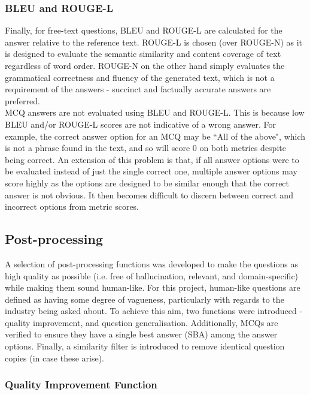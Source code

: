 \subsubsection{BLEU and ROUGE-L}

Finally, for free-text questions, BLEU and ROUGE-L are calculated for the answer relative to the reference text. ROUGE-L is chosen (over ROUGE-N) as it is designed to evaluate the semantic similarity and content coverage of text regardless of word order. ROUGE-N on the other hand simply evaluates the grammatical correctness and fluency of the generated text, which is not a requirement of the answers - succinct and factually accurate answers are preferred.\\

MCQ answers are not evaluated using BLEU and ROUGE-L. This is because low BLEU and/or ROUGE-L scores are not indicative of a wrong answer. For example, the correct answer option for an MCQ may be ``All of the above", which is not a phrase found in the text, and so will score 0 on both metrics despite being correct. An extension of this problem is that, if all answer options were to be evaluated instead of just the single correct one, multiple answer options may score highly as the options are designed to be similar enough that the correct answer is not obvious. It then becomes difficult to discern between correct and incorrect options from metric scores.

\subsection{Post-processing}

A selection of post-processing functions was developed to make the questions as high quality as possible (i.e. free of hallucination, relevant, and domain-specific) while making them sound human-like. For this project, human-like questions are defined as having some degree of vagueness, particularly with regards to the industry being asked about. To achieve this aim, two functions were introduced - quality improvement, and question generalisation. Additionally, MCQs are verified to ensure they have a single best answer (SBA) among the answer options. Finally, a similarity filter is introduced to remove identical question copies (in case these arise).

\subsubsection{Quality Improvement Function}



